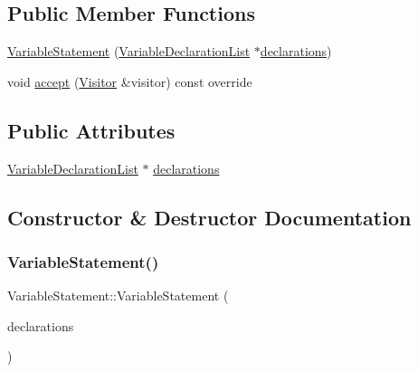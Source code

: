 \subsection*{Public Member Functions}
\begin{DoxyCompactItemize}
\item 
\hyperlink{struct_variable_statement_a1ebce27ac048580b3a41723a2defd46a}{Variable\+Statement} (\hyperlink{struct_variable_declaration_list}{Variable\+Declaration\+List} $\ast$\hyperlink{struct_variable_statement_a9d1cdb228d5cb079e228180532cec942}{declarations})
\item 
void \hyperlink{struct_variable_statement_a55446c8cfa8fd620de4b72f7efca86bd}{accept} (\hyperlink{struct_visitor}{Visitor} \&visitor) const override
\end{DoxyCompactItemize}
\subsection*{Public Attributes}
\begin{DoxyCompactItemize}
\item 
\hyperlink{struct_variable_declaration_list}{Variable\+Declaration\+List} $\ast$ \hyperlink{struct_variable_statement_a9d1cdb228d5cb079e228180532cec942}{declarations}
\end{DoxyCompactItemize}


\subsection{Constructor \& Destructor Documentation}
\mbox{\label{struct_variable_statement_a1ebce27ac048580b3a41723a2defd46a}} 
\subsubsection{\texorpdfstring{Variable\+Statement()}{VariableStatement()}}
{\footnotesize\ttfamily Variable\+Statement\+::\+Variable\+Statement (\begin{DoxyParamCaption}\item[{\hyperlink{struct_variable_declaration_list}{Variable\+Declaration\+List} $\ast$}]{declarations }\end{DoxyParamCaption})\hspace{0.3cm}{\ttfamily [inline]}}



